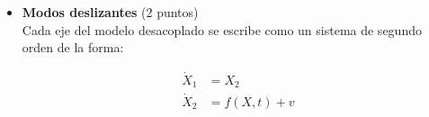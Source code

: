 \begin{enumerate}
\begin{itemize}
        Dado que \(P\) es simétrica, se tiene que \(P^T=P\), por lo que:

        \begin{equation*}
            A^TP+PA-P^TF^TB^TP-PBFP=A^TP+PA-P(F^TB^T+BF)P\\
        \end{equation*}

        Haciendo el siguiente cambio de variable:

        \begin{equation*}
            \gamma=P^{-1},\quad F=K\gamma
        \end{equation*}

        Multiplicando por \(\gamma\) a la izquierda y derecha, se obtiene que:

        \begin{equation*}
            \begin{aligned}
                \gamma[A^TP+PA-P(F^TB^T+BF)P]\gamma<0\\
                \gamma A^TP\gamma+\gamma PA\gamma-\gamma P(F^TB^T+BF)P\gamma<0\\
            \end{aligned}
        \end{equation*}

        Dado que \(\gamma P = I\) y \(P\gamma = I\), se tiene que:

        \begin{equation*}
            \gamma A^T + A\gamma - (F^TB^T + BF) < 0
        \end{equation*}

        Dado que es necesario asegurarse que el contrador de \(\tau\) sea más rapido, se agrega un término de amortiguamiento, por lo que la ecuación final es:

        \begin{equation*}
            \gamma A^T + A\gamma - (F^TB^T + BF) + \alpha\gamma < 0
        \end{equation*}








        \item \textbf{Modos deslizantes} (2 puntos)\\

        Cada eje del modelo desacoplado se escribe como un sistema de segundo orden de la forma:

        \begin{equation*}
            \begin{aligned}
                \dot{X}_1 &= X_2 \\
                \dot{X}_2 &= f(X,t)+v
            \end{aligned}
        \end{equation*}


\end{itemize}
\end{enumerate}
